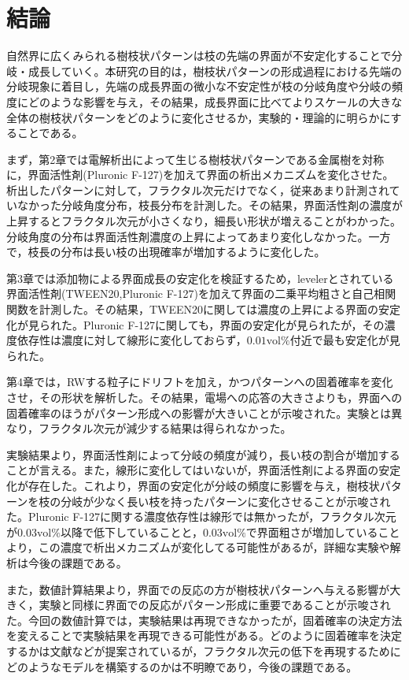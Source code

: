 \documentclass[autodetect-engine,dvi=dvipdfmx,a4paper,ja=standard,oneside,openany,11pt,draft]{bxjsbook}
\begin{document}
\chapter{結論}
自然界に広くみられる樹枝状パターンは枝の先端の界面が不安定化することで分岐・成長していく。本研究の目的は，樹枝状パターンの形成過程における先端の分岐現象に着目し，先端の成長界面の微小な不安定性が枝の分岐角度や分岐の頻度にどのような影響を与え，その結果，成長界面に比べてよりスケールの大きな全体の樹枝状パターンをどのように変化させるか，実験的・理論的に明らかにすることである。

まず，第2章では電解析出によって生じる樹枝状パターンである金属樹を対称に，界面活性剤(Pluronic F-127)を加えて界面の析出メカニズムを変化させた。析出したパターンに対して，フラクタル次元だけでなく，従来あまり計測されていなかった分岐角度分布，枝長分布を計測した。その結果，界面活性剤の濃度が上昇するとフラクタル次元が小さくなり，細長い形状が増えることがわかった。分岐角度の分布は界面活性剤濃度の上昇によってあまり変化しなかった。一方で，枝長の分布は長い枝の出現確率が増加するように変化した。

第3章では添加物による界面成長の安定化を検証するため，levelerとされている界面活性剤(TWEEN20,Pluronic F-127)を加えて界面の二乗平均粗さと自己相関関数を計測した。その結果，TWEEN20に関しては濃度の上昇による界面の安定化が見られた。Pluronic F-127に関しても，界面の安定化が見られたが，その濃度依存性は濃度に対して線形に変化しておらず，$0.01 \mathrm{vol\%}$付近で最も安定化が見られた。

第4章では，RWする粒子にドリフトを加え，かつパターンへの固着確率を変化させ，その形状を解析した。その結果，電場への応答の大きさよりも，界面への固着確率のほうがパターン形成への影響が大きいことが示唆された。実験とは異なり，フラクタル次元が減少する結果は得られなかった。

実験結果より，界面活性剤によって分岐の頻度が減り，長い枝の割合が増加することが言える。また，線形に変化してはいないが，界面活性剤による界面の安定化が存在した。これより，界面の安定化が分岐の頻度に影響を与え，樹枝状パターンを枝の分岐が少なく長い枝を持ったパターンに変化させることが示唆された。Pluronic F-127に関する濃度依存性は線形では無かったが，フラクタル次元が$0.03 \mathrm{vol\%}$以降で低下していることと，$0.03 \mathrm{vol\%}$で界面粗さが増加していることより，この濃度で析出メカニズムが変化してる可能性があるが，詳細な実験や解析は今後の課題である。

また，数値計算結果より，界面での反応の方が樹枝状パターンへ与える影響が大きく，実験と同様に界面での反応がパターン形成に重要であることが示唆された。今回の数値計算では，実験結果は再現できなかったが，固着確率の決定方法を変えることで実験結果を再現できる可能性がある。どのように固着確率を決定するかは文献\cite{vicsek1984pattern}\cite{nittmann1986tip}などが提案されているが，フラクタル次元の低下を再現するためにどのようなモデルを構築するのかは不明瞭であり，今後の課題である。

\ifdraft{
  
  
}{}
\end{document}
